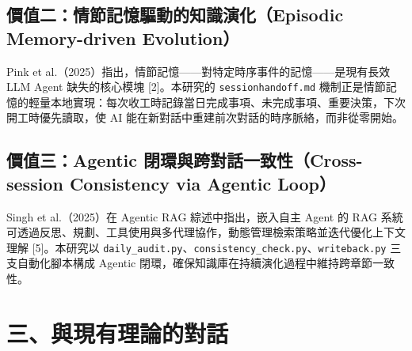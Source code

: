 \subsection{價值二：情節記憶驅動的知識演化（Episodic Memory-driven
Evolution）}\label{ux50f9ux503cux4e8cux60c5ux7bc0ux8a18ux61b6ux9a45ux52d5ux7684ux77e5ux8b58ux6f14ux5316episodic-memory-driven-evolution}

Pink et
al.（2025）指出，情節記憶------對特定時序事件的記憶------是現有長效 LLM
Agent 缺失的核心模塊 {[}2{]}。本研究的 \texttt{sessionhandoff.md}
機制正是情節記憶的輕量本地實現：每次收工時記錄當日完成事項、未完成事項、重要決策，下次開工時優先讀取，使
AI 能在新對話中重建前次對話的時序脈絡，而非從零開始。

\subsection{價值三：Agentic 閉環與跨對話一致性（Cross-session
Consistency via Agentic
Loop）}\label{ux50f9ux503cux4e09agentic-ux9589ux74b0ux8207ux8de8ux5c0dux8a71ux4e00ux81f4ux6027cross-session-consistency-via-agentic-loop}

Singh et al.（2025）在 Agentic RAG 綜述中指出，嵌入自主 Agent 的 RAG
系統可透過反思、規劃、工具使用與多代理協作，動態管理檢索策略並迭代優化上下文理解
{[}5{]}。本研究以
\texttt{daily\_audit.py}、\texttt{consistency\_check.py}、\texttt{writeback.py}
三支自動化腳本構成 Agentic
閉環，確保知識庫在持續演化過程中維持跨章節一致性。

\section{三、與現有理論的對話}\label{ux4e09ux8207ux73feux6709ux7406ux8ad6ux7684ux5c0dux8a71}

